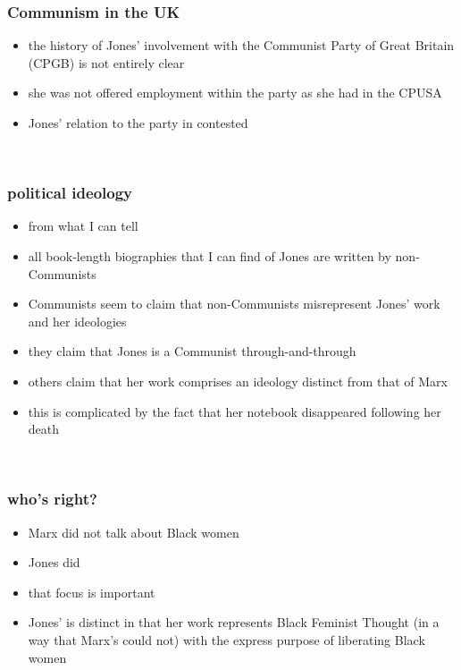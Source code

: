 \documentclass{beamer}
\begin{document}
\begin{frame} 
	\frametitle{Communism in the UK}
	\begin{itemize}
		\item the history of Jones' involvement with the Communist Party of Great Britain (CPGB) is not entirely clear
		\item she was not offered employment within the party as she had in the CPUSA
		\item Jones' relation to the party in contested
	\end{itemize}

	\vfill
	\ \hfill \citep{LalkarP}
\end{frame}

\begin{frame} 
	\frametitle{political ideology}
	\begin{itemize}
		\item from what I can tell
		\item all book-length biographies that I can find of Jones are written by non-Communists
		\item Communists seem to claim that non-Communists misrepresent Jones' work and her ideologies
		\item they claim that Jones is a Communist through-and-through
		\item others claim that her work comprises an ideology distinct from that of Marx
		\item this is complicated by the fact that her notebook disappeared following her death
	\end{itemize}

	\vfill
	\ \hfill \citep{LalkarP}
\end{frame}

\begin{frame} 
	\frametitle{who's right?}
	\begin{itemize}
		\item Marx did not talk about Black women
		\item Jones did
		\item that focus is important
		\item Jones' is distinct in that her work represents Black Feminist Thought (in a way that Marx's could not) with the express purpose of liberating Black women
	\end{itemize}
\end{frame}

\begin{frame}


\end{frame}
\end{document}
